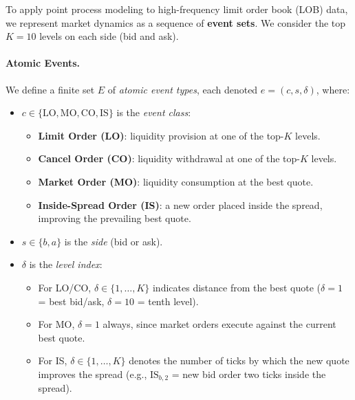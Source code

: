 To apply point process modeling to high-frequency limit order book (LOB) data, we represent market dynamics as a sequence of \textbf{event sets}. We consider the top $K=10$ levels on each side (bid and ask).  

\paragraph{Atomic Events.}  
We define a finite set $E$ of \emph{atomic event types}, each denoted $e=(c,s,\delta)$, where:
\begin{itemize}[leftmargin=1.2em]
    \item $c \in \{\text{LO}, \text{MO}, \text{CO}, \text{IS}\}$ is the \emph{event class}:
        \begin{itemize}
            \item \textbf{Limit Order (LO)}: liquidity provision at one of the top-$K$ levels.
            \item \textbf{Cancel Order (CO)}: liquidity withdrawal at one of the top-$K$ levels.
            \item \textbf{Market Order (MO)}: liquidity consumption at the best quote.
            \item \textbf{Inside-Spread Order (IS)}: a new order placed inside the spread, improving the prevailing best quote.
        \end{itemize}
    \item $s \in \{b,a\}$ is the \emph{side} (bid or ask).
    \item $\delta$ is the \emph{level index}:
        \begin{itemize}
            \item For LO/CO, $\delta \in \{1,\dots,K\}$ indicates distance from the best quote ($\delta=1$ = best bid/ask, $\delta=10$ = tenth level).
            \item For MO, $\delta=1$ always, since market orders execute against the current best quote.
            \item For IS, $\delta \in \{1,\dots,K\}$ denotes the number of ticks by which the new quote improves the spread (e.g., $\text{IS}_{b,2}$ = new bid order two ticks inside the spread).
        \end{itemize}
\end{itemize}

